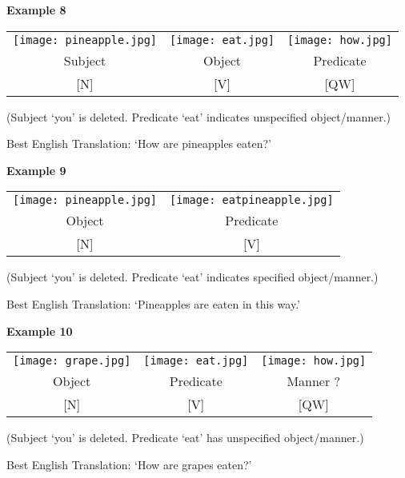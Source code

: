 \documentclass{tufte-book}
\begin{document}
\vspace{0.25cm}\noindent \textbf{Example 8}
\begin{table*}[h!]
\begin{tabular}{c | c |c}
\texttt{[image: pineapple.jpg]}&\texttt{[image: eat.jpg]}&\texttt{[image: how.jpg]}\\
\footnotesize Subject& \footnotesize Object & \footnotesize Predicate\\
\footnotesize [N] & \footnotesize [V] & \footnotesize [QW]\\
\end{tabular}
\end{table*}
\begin{fullwidth}
(Subject `you' is deleted. Predicate `eat' indicates unspecified object/manner.)

Best English Translation: `How are pineapples eaten?'
\end{fullwidth}
\newpage
\noindent \textbf{Example 9}
\begin{table*}[h!]
\begin{tabular}{c | c }
\texttt{[image: pineapple.jpg]}&\texttt{[image: eatpineapple.jpg]}\\
\footnotesize Object &  \footnotesize Predicate\\
 \footnotesize [N] & \footnotesize [V]\\
\end{tabular}
\end{table*}
\begin{fullwidth}
(Subject `you' is deleted. Predicate `eat' indicates specified object/manner.)

Best English Translation: `Pineapples are eaten in this way.'
\end{fullwidth}

\vspace{0.25cm}\noindent \textbf{Example 10}
\begin{table*}[h!]
\begin{tabular}{c | c |c}
\texttt{[image: grape.jpg]}&\texttt{[image: eat.jpg]}&\texttt{[image: how.jpg]}\\
\footnotesize Object & \footnotesize Predicate & \footnotesize Manner ?\\
\footnotesize [N] & \footnotesize [V] & \footnotesize [QW]\\
\end{tabular}
\end{table*}
\begin{fullwidth}
(Subject `you' is deleted. Predicate `eat' has unspecified object/manner.)

Best English Translation: `How are grapes eaten?'
\end{fullwidth}
\end{document}
